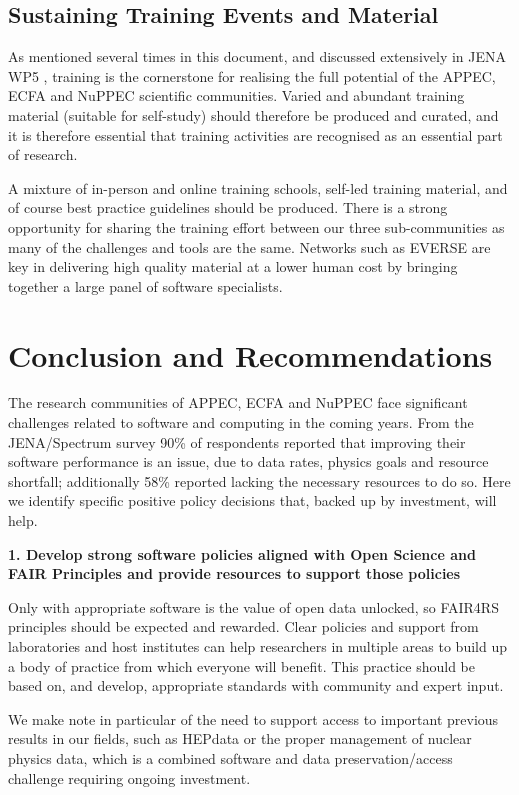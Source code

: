 \subsection{Sustaining Training Events and Material}

As mentioned several times in this document, and discussed extensively in JENA WP5 \cite{JENA_WG_Reports}, training is the cornerstone for realising the full potential of the APPEC, ECFA and NuPPEC scientific communities. Varied and abundant training material (suitable for self-study) should therefore be produced and curated, and it is therefore essential that training activities are recognised as an essential part of research.

A mixture of in-person and online training schools, self-led training material, and of course best practice guidelines should be produced. There is a strong opportunity for sharing the training effort between our three sub-communities as many of the challenges and tools are the same. Networks such as EVERSE are key in delivering high quality material at a lower human cost by bringing together a large panel of software specialists.


\section{Conclusion and Recommendations}

The research communities of APPEC, ECFA and NuPPEC face significant challenges related to software and computing in the coming years. From the JENA/Spectrum survey 90\% of respondents reported that improving their software performance is an issue, due to data rates, physics goals and resource shortfall; additionally 58\% reported lacking the necessary resources to do so. Here we identify specific positive policy decisions that, backed up by investment, will help.

{\bf 1. Develop strong software policies aligned with Open Science and FAIR Principles and provide resources to support those policies}

Only with appropriate software is the value of open data unlocked, so FAIR4RS principles should be expected and rewarded. Clear policies and support from laboratories and host institutes can help researchers in multiple areas to build up a body of practice from which everyone will benefit. This practice should be based on, and develop, appropriate standards with community and expert input.

We make note in particular of the need to support access to important previous results in our fields, such as HEPdata or the proper management of nuclear physics data, which is a combined software and data preservation/access challenge requiring ongoing investment.


